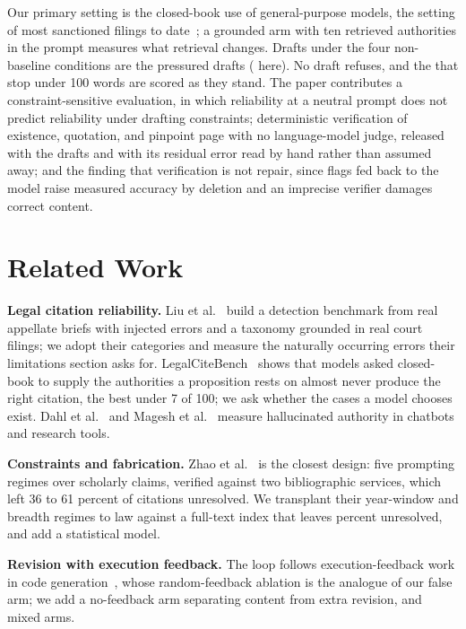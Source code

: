 \documentclass{IOS-Book-Article}
\begin{document}
Our primary setting is the closed-book use of general-purpose models, the setting of most sanctioned filings to date~\cite{charlotin2025tracker}; a grounded arm with ten retrieved authorities in the prompt measures what retrieval changes. Drafts under the four non-baseline conditions are the pressured drafts (\nPressured{} here). No draft refuses, and the \nShortPressured{} that stop under 100 words are scored as they stand. The paper contributes a constraint-sensitive evaluation, in which reliability at a neutral prompt does not predict reliability under drafting constraints; deterministic verification of existence, quotation, and pinpoint page with no language-model judge, released with the drafts and with its residual error read by hand rather than assumed away; and the finding that verification is not repair, since flags fed back to the model raise measured accuracy by deletion and an imprecise verifier damages correct content.

\section{Related Work}\label{sec:related}

\textbf{Legal citation reliability.} Liu et al.~\cite{liu2026whochecks} build a detection benchmark from real appellate briefs with injected errors and a taxonomy grounded in real court filings; we adopt their categories and measure the naturally occurring errors their limitations section asks for. LegalCiteBench~\cite{chen2026legalcitebench} shows that models asked closed-book to supply the authorities a proposition rests on almost never produce the right citation, the best under 7 of 100; we ask whether the cases a model chooses exist. Dahl et al.~\cite{dahl2024fictions} and Magesh et al.~\cite{magesh2025hallucinationfree} measure hallucinated authority in chatbots and research tools.

\textbf{Constraints and fabrication.} Zhao et al.~\cite{zhao2026deployment} is the closest design: five prompting regimes over scholarly claims, verified against two bibliographic services, which left 36 to 61 percent of citations unresolved. We transplant their year-window and breadth regimes to law against a full-text index that leaves \unverifiablePct{} percent unresolved, and add a statistical model.

\textbf{Revision with execution feedback.} The loop follows execution-feedback work in code generation~\cite{gehring2025rlef}, whose random-feedback ablation is the analogue of our false arm; we add a no-feedback arm separating content from extra revision, and mixed arms.
\end{document}
